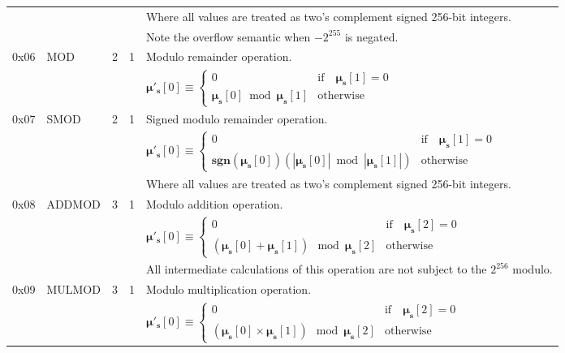 \documentclass[9pt,oneside]{amsart}
\begin{document}
\begin{tabular*}{\columnwidth}[h]{rlrrl}
&&&& Where all values are treated as two's complement signed 256-bit integers. \\
&&&& Note the overflow semantic when $-2^{255}$ is negated.\\
\midrule
0x06 & {\small MOD} & 2 & 1 & Modulo remainder operation. \\
&&&& $\boldsymbol{\mu}'_{\mathbf{s}}[0] \equiv \begin{cases}0 & \text{if} \quad \boldsymbol{\mu}_{\mathbf{s}}[1] = 0\\ \boldsymbol{\mu}_{\mathbf{s}}[0] \bmod \boldsymbol{\mu}_{\mathbf{s}}[1] & \text{otherwise}\end{cases}$  \\
\midrule
0x07 & {\small SMOD} & 2 & 1 & Signed modulo remainder operation. \\
&&&& $\boldsymbol{\mu}'_{\mathbf{s}}[0] \equiv \begin{cases}0 & \text{if} \quad \boldsymbol{\mu}_{\mathbf{s}}[1] = 0\\ \mathbf{sgn} (\boldsymbol{\mu}_{\mathbf{s}}[0]) (|\boldsymbol{\mu}_{\mathbf{s}}[0]| \bmod |\boldsymbol{\mu}_{\mathbf{s}}[1]|) & \text{otherwise}\end{cases}$  \\
&&&& Where all values are treated as two's complement signed 256-bit integers. \\
\midrule
0x08 & {\small ADDMOD} & 3 & 1 & Modulo addition operation. \\
&&&& $\boldsymbol{\mu}'_{\mathbf{s}}[0] \equiv \begin{cases}0 & \text{if} \quad \boldsymbol{\mu}_{\mathbf{s}}[2] = 0\\ (\boldsymbol{\mu}_{\mathbf{s}}[0] + \boldsymbol{\mu}_{\mathbf{s}}[1]) \mod \boldsymbol{\mu}_{\mathbf{s}}[2] & \text{otherwise}\end{cases}$  \\
&&&& All intermediate calculations of this operation are not subject to the $2^{256}$ modulo. \\
\midrule
0x09 & {\small MULMOD} & 3 & 1 & Modulo multiplication operation. \\
&&&& $\boldsymbol{\mu}'_{\mathbf{s}}[0] \equiv \begin{cases}0 & \text{if} \quad \boldsymbol{\mu}_{\mathbf{s}}[2] = 0\\ (\boldsymbol{\mu}_{\mathbf{s}}[0] \times \boldsymbol{\mu}_{\mathbf{s}}[1]) \mod \boldsymbol{\mu}_{\mathbf{s}}[2] & \text{otherwise}\end{cases}$  \\

\end{tabular*}
\end{document}
